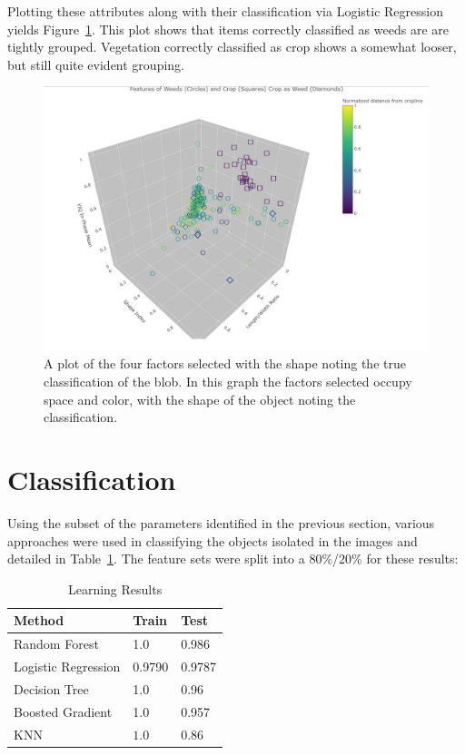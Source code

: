\documentclass[letterpaper]{article}
\begin{document}
{Plotting these attributes along with their classification via Logistic Regression yields Figure~\ref{fig:factors}. This plot shows that items correctly classified as weeds are are tightly grouped. Vegetation correctly classified as crop shows a somewhat looser, but still quite evident grouping.
 \begin{figure}[H]
	\centering
	\includegraphics[width=0.9\linewidth]{./figures/plot-factors.png}
	\caption[Factors selected for discrimination]{A plot of the four factors selected with the shape noting the true classification of the blob. In this graph the factors selected occupy space and color, with the shape of the object noting the classification.}
	\label{fig:factors}
\end{figure}
  
\section{Classification}

Using the subset of the parameters identified in the previous section, various approaches were used in classifying the objects isolated in the images and detailed in Table~\ref{fig:learning}. The feature sets were split into a 80\%/20\% for these results: 

{\renewcommand{\arraystretch}{2}%
\begin{table}[H]
	\centering
    \caption{Learning Results}
    \label{fig:learning}
    \begin{tabular}{  l  p{4cm}  p{5cm} }
        \toprule
\textbf{Method}      
& \textbf{Train}   
& \textbf{Test} \\\midrule
Random Forest      
& 1.0
& 0.986 \\\hline
Logistic Regression
& 0.9790       
& 0.9787 \\\hline
Decision Tree
& 1.0
& 0.96 \\\hline
Boosted Gradient     
& 1.0
& 0.957 \\\hline
KNN     
& $1.0$                    
& $0.86$ \\\hline
        \bottomrule
    \end{tabular}
\end{table}

}}
\end{document}
